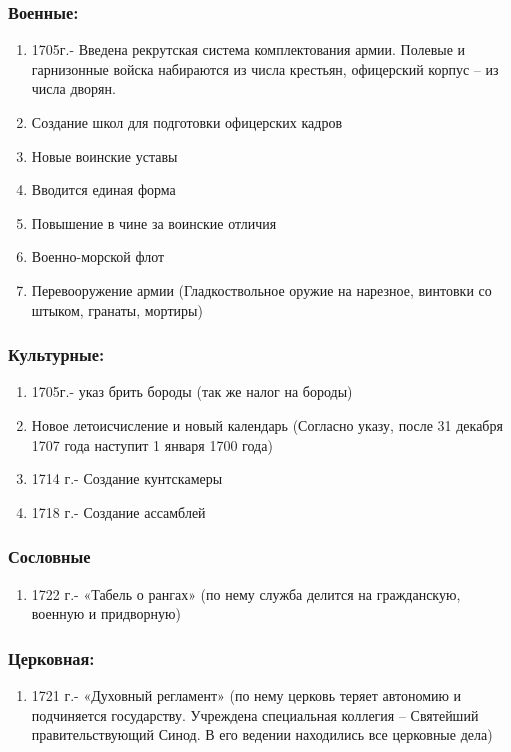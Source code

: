 \subsubsection{Военные:}

\begin{enumerate}
    \item{ 1705г.- Введена рекрутская система комплектования армии. Полевые и гарнизонные войска набираются из числа крестьян, офицерский корпус – из числа дворян. }
    \item{ Создание школ для подготовки офицерских кадров }
    \item{ Новые воинские уставы }
    \item{ Вводится единая форма }
    \item{ Повышение в чине за воинские отличия }
    \item{ Военно-морской флот }
    \item{ Перевооружение армии (Гладкоствольное оружие на нарезное, винтовки со штыком, гранаты, мортиры) }
\end{enumerate}

\subsubsection{Культурные:}

\begin{enumerate}
    \item{ 1705г.- указ брить бороды (так же налог на бороды)}
    \item{ Новое летоисчисление и новый календарь (Согласно указу, после 31 декабря 1707 года наступит 1 января 1700 года)}
    \item{ 1714 г.- Создание кунтскамеры}
    \item{ 1718 г.- Создание ассамблей}
\end{enumerate}

\subsubsection{Сословные}

\begin{enumerate}
    \item{ 1722 г.- «Табель о рангах» (по нему служба делится на гражданскую, военную и придворную) }
\end{enumerate}

\subsubsection{Церковная:}

\begin{enumerate}
    \item{ 1721 г.- «Духовный регламент» (по нему церковь теряет автономию и подчиняется государству. Учреждена специальная коллегия – Святейший правительствующий Синод. В его ведении находились все церковные дела) }
\end{enumerate}
